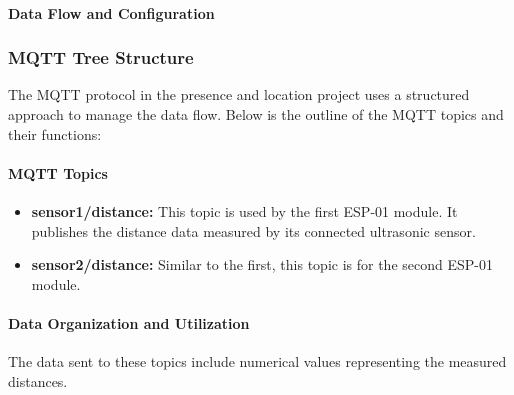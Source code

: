 \paragraph{Data Flow and Configuration}

\subsubsection{MQTT Tree Structure}
The MQTT protocol in the presence and location project uses a structured approach to manage the data flow. Below is the outline of the MQTT topics and their functions:

\paragraph{MQTT Topics}
\begin{itemize}
    \item \textbf{sensor1/distance:} This topic is used by the first ESP-01 module. It publishes the distance data measured by its connected ultrasonic sensor.
    \item \textbf{sensor2/distance:} Similar to the first, this topic is for the second ESP-01 module.
\end{itemize}

\paragraph{Data Organization and Utilization}
The data sent to these topics include numerical values representing the measured distances. 